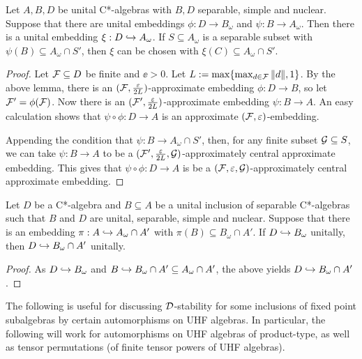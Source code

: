 \documentclass[12pt]{amsart}
\begin{document}
      \begin{cor}
        Let $A,B,D$ be unital C*-algebras with $B,D$ separable, simple and nuclear. Suppose that there are unital embeddings $\phi: D \to B_\omega$ and $\psi: B \to A_\omega$.  Then there is a unital embedding $\xi: D \hookrightarrow A_\omega$. If $S \subseteq A_\omega$ is a separable subset with $\psi(B) \subseteq A_\omega \cap S'$, then $\xi$ can be chosen with $\xi(C) \subseteq A_\omega \cap S'$. 
          \begin{proof}
            Let $\mathcal{F} \subseteq D$ be finite and $\ee > 0$. Let $L := \max\{\max_{d \in \mathcal{F}}\|d\|,1\}$. By the above lemma, there is an $(\mathcal{F},\frac{\varepsilon}{2L})$-approximate embedding $\phi: D \to B$, so let $\mathcal{F}' = \phi(\mathcal{F})$. Now there is an $(\mathcal{F}',\frac{\varepsilon}{2L})$-approximate embedding $\psi: B \to A$. An easy calculation shows that $\psi \circ \phi: D \to A$ is an approximate $(\mathcal{F},\varepsilon)$-embedding. 

            Appending the condition that $\psi: B \to A_\omega  \cap S'$, then, for any finite subset $\mathcal{G} \subseteq S$, we can take $\psi: B \to A$ to be a $(\mathcal{F}',\frac{\varepsilon}{2L},\mathcal{G})$-approximately central approximate embedding. This gives that $\psi \circ \phi: D \to A$ is be a $(\mathcal{F},\varepsilon,\mathcal{G})$-approximately central approximate embedding. 
          \end{proof}
      \end{cor}

        \begin{cor}
          Let  $D$ be a C*-algebra and $B \subseteq A$ be a unital inclusion of separable C*-algebras such that $B$ and $D$ are unital, separable, simple and nuclear. Suppose that there is an embedding $\pi: A \hookrightarrow A_\omega \cap A'$ with $\pi(B) \subseteq B_\omega \cap A'$. If $D \hookrightarrow B_\omega$ unitally, then $D \hookrightarrow B_\omega \cap A'$ unitally.
            \begin{proof}
              As $D \hookrightarrow B_\omega$ and $B \hookrightarrow B_\omega \cap A' \subseteq A_\omega \cap A'$, the above yields $D \hookrightarrow B_\omega \cap A'$. 
            \end{proof}
        \end{cor}


The following is useful for discussing $\mathcal{D}$-stability for some inclusions of fixed point subalgebras by certain automorphisms on UHF algebras.  In particular, the following will work for automorphisms on UHF algebras of product-type, as well as tensor permutations (of finite tensor powers of UHF algebras). 
\end{document}
